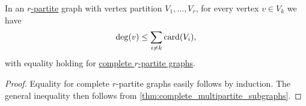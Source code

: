 \begin{lemma}\label{thm:multipartite_graph_degree}
  In an \hyperref[def:multipartite_graph]{\( r \)-partite} graph with vertex partition \( V_1, \ldots, V_r \), for every vertex \( v \in V_k \) we have
  \begin{equation*}
    \deg(v) \leq \sum_{i \neq k} \operatorname{card}(V_i),
  \end{equation*}
  with equality holding for \hyperref[def:complete_multipartite_graph]{complete \( r \)-partite graphs}.
\end{lemma}
\begin{proof}
  Equality for complete \( r \)-partite graphs easily follows by induction. The general inequality then follows from \cref{thm:complete_multipartite_subgraphs}.
\end{proof}

